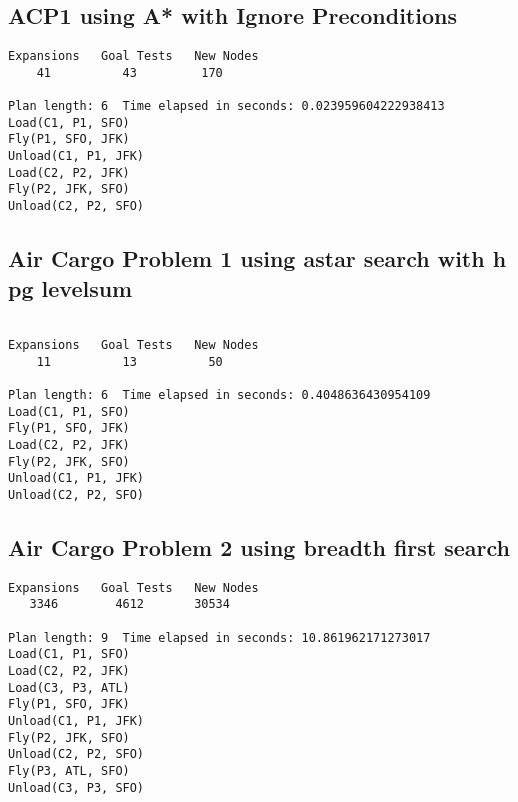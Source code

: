 \documentclass[11pt,a4paper]{report}
\begin{document}
\subsection*{ ACP1 using A* with Ignore Preconditions }
\begin{verbatim}
Expansions   Goal Tests   New Nodes
    41          43         170

Plan length: 6  Time elapsed in seconds: 0.023959604222938413
Load(C1, P1, SFO)
Fly(P1, SFO, JFK)
Unload(C1, P1, JFK)
Load(C2, P2, JFK)
Fly(P2, JFK, SFO)
Unload(C2, P2, SFO)
\end{verbatim}
\subsection*{ Air Cargo Problem 1 using astar search with h pg levelsum}
\begin{verbatim}

Expansions   Goal Tests   New Nodes
    11          13          50

Plan length: 6  Time elapsed in seconds: 0.4048636430954109
Load(C1, P1, SFO)
Fly(P1, SFO, JFK)
Load(C2, P2, JFK)
Fly(P2, JFK, SFO)
Unload(C1, P1, JFK)
Unload(C2, P2, SFO)
\end{verbatim}
\subsection*{  Air Cargo Problem 2 using breadth first search}
\begin{verbatim}
Expansions   Goal Tests   New Nodes
   3346        4612       30534

Plan length: 9  Time elapsed in seconds: 10.861962171273017
Load(C1, P1, SFO)
Load(C2, P2, JFK)
Load(C3, P3, ATL)
Fly(P1, SFO, JFK)
Unload(C1, P1, JFK)
Fly(P2, JFK, SFO)
Unload(C2, P2, SFO)
Fly(P3, ATL, SFO)
Unload(C3, P3, SFO)
\end{verbatim}
\end{document}
